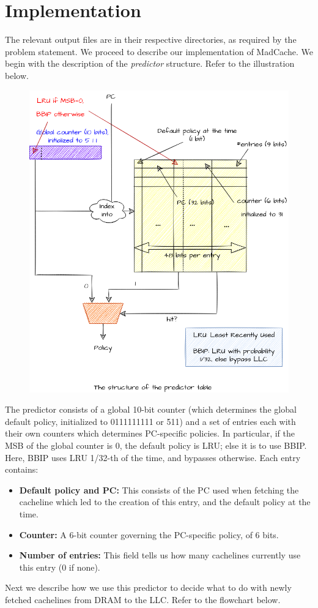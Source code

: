 \documentclass[11pt, swedish, openany]{book}
\begin{document}
\section{Implementation}
The relevant output files are in their respective directories, as required by the problem statement. We proceed to describe our implementation of MadCache. We begin with the description of the \textit{predictor} structure. Refer to the illustration below.
\begin{figure}[H]
    \centering
    \includegraphics[width=0.55\linewidth]{images/predictor.png}
\end{figure}
The predictor consists of a global 10-bit counter (which determines the global default policy, initialized to 0111111111 or 511) and a set of entries each with their own counters which determines PC-specific policies. In particular, if the MSB of the global counter is 0, the default policy is LRU; else it is to use BBIP. Here, BBIP uses LRU 1/32-th of the time, and bypasses otherwise. Each entry contains:
\begin{itemize}
    \item \textbf{Default policy and PC:} This consists of the PC used when fetching the cacheline which led to the creation of this entry, and the default policy at the time.
    \item \textbf{Counter:} A 6-bit counter governing the PC-specific policy, of 6 bits.
    \item \textbf{Number of entries:} This field tells us how many cachelines currently use this entry (0 if none).
\end{itemize}
Next we describe how we use this predictor to decide what to do with newly fetched cachelines from DRAM to the LLC. Refer to the flowchart below.
\end{document}
